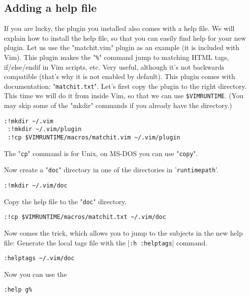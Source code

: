 \subsection{Adding a help file}
\label{add-local-help}
\label{matchit-install}

If you are lucky, the plugin you installed also comes with a help file.
We will explain how to install the help file, so that you can easily find help for your new plugin.
Let us use the "matchit.vim" plugin as an example (it is included with Vim).
This plugin makes the "\verb!%!" command jump to matching HTML tags, if/else/endif in Vim scripts, etc.
Very useful, although it's not backwards compatible (that's why it is not enabled by default).
This plugin comes with documentation: "\verb!matchit.txt!".
Let's first copy the plugin to the right directory.
This time we will do it from inside Vim, so that we can use \verb!$VIMRUNTIME!.
(You may skip some of the "mkdir" commands if you already have the directory.)

 \begin{Verbatim}[samepage=true]
 :!mkdir ~/.vim
 :!mkdir ~/.vim/plugin
 :!cp $VIMRUNTIME/macros/matchit.vim ~/.vim/plugin
 \end{Verbatim}

The "\verb!cp!" command is for Unix, on MS-DOS you can use "\verb!copy!".

Now create a "\verb!doc!" directory in one of the directories in '\verb!runtimepath!'.

 \begin{Verbatim}[samepage=true]
 :!mkdir ~/.vim/doc
 \end{Verbatim}

Copy the help file to the "\verb!doc!" directory.

 \begin{Verbatim}[samepage=true]
 :!cp $VIMRUNTIME/macros/matchit.txt ~/.vim/doc
 \end{Verbatim}

Now comes the trick, which allows you to jump to the subjects in the new help file: Generate the local tags file with the |\verb!:h :helptags!| command.

 \begin{Verbatim}[samepage=true]
 :helptags ~/.vim/doc
 \end{Verbatim}

Now you can use the

 \begin{Verbatim}[samepage=true]
 :help g%
 \end{Verbatim}

